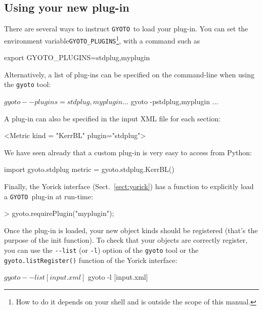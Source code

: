 \documentclass[a4paper,12pt]{article}
\newcommand{\GYOTO}{\texttt{GYOTO}}
\begin{document}
\subsection{Using your new plug-in}
\label{sect:using-plug-in}
There are several ways to instruct \GYOTO\ to load your plug-in. You
can set the environment variable\texttt{GYOTO\_PLUGINS}\footnote{How
  to do it depends on your shell and is outside the scope of this
  manual.}, with a command such as
\begin{code}
  export GYOTO_PLUGINS=stdplug,myplugin
\end{code}
Alternatively, a list of plug-ins can be specified on the command-line
when using the \texttt{gyoto} tool:
\begin{code}
  $ gyoto --plugins=stdplug,myplugin ...
  $ gyoto -pstdplug,myplugin ...
\end{code}
A plug-in can also be specified in the input XML file for each
section:
\begin{code}
   <Metric kind = "KerrBL" plugin="stdplug">
\end{code}
We have seen already that a custom plug-in is very easy to access from
Python:
\begin{code}
  import gyoto.stdplug
  metric = gyoto.stdplug.KerrBL()
\end{code}
Finally, the Yorick interface (Sect.~\ref{sect:yorick}) has a function
to explicitly load a \GYOTO\ plug-in at run-time:
\begin{code}
 > gyoto.requirePlugin("myplugin");
\end{code}
Once the plug-in is loaded, your new object kinds should be registered
(that's the purpose of the init function). To check that your objects
are correctly register, you can use the \texttt{-{}-list} (or
\texttt{-l}) option of the \texttt{gyoto} tool or the
\texttt{gyoto.listRegister()} function of the Yorick interface:
\begin{code}
  $ gyoto --list [input.xml]
  $ gyoto -l [input.xml]
\end{code}
\end{document}
